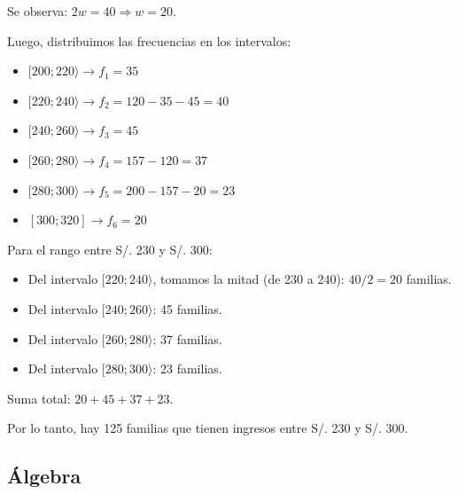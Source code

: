 \begin{enumerate}
	Se observa: $2w = 40 \Rightarrow w = 20$.
	
	Luego, distribuimos las frecuencias en los intervalos:
	\begin{itemize}
		\item $[200; 220\rangle \rightarrow f_1 = 35$
		\item $[220; 240\rangle \rightarrow f_2 = 120 - 35 - 45 = 40$
		\item $[240; 260\rangle \rightarrow f_3 = 45$
		\item $[260; 280\rangle \rightarrow f_4 = 157 - 120 = 37$
		\item $[280; 300\rangle \rightarrow f_5 = 200 - 157 - 20 = 23$
		\item $[300; 320] \rightarrow f_6 = 20$
	\end{itemize}
	
	Para el rango entre S/. 230 y S/. 300:
	\begin{itemize}
		\item Del intervalo $[220; 240\rangle$, tomamos la mitad (de 230 a 240): $40 / 2 = 20$ familias.
		\item Del intervalo $[240; 260\rangle$: 45 familias.
		\item Del intervalo $[260; 280\rangle$: 37 familias.
		\item Del intervalo $[280; 300\rangle$: 23 familias.
	\end{itemize}
	
	Suma total: $20 + 45 + 37 + 23 $.
	
	Por lo tanto, hay 125 familias que tienen ingresos entre S/. 230 y S/. 300.
	
	

	
	\vspace{6mm}

\end{enumerate}





\subsection*{Álgebra}

